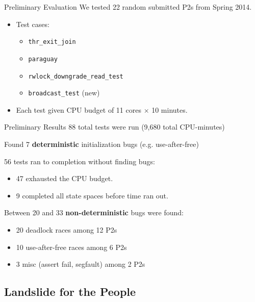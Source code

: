 \documentclass[xcolor=dvipsnames]{beamer}
\begin{document}
\begin{frame}{Preliminary Evaluation}
	We tested 22 random submitted P2s from Spring 2014.
	\begin{itemize}
		\item Test cases:
		\begin{itemize}
			\item {\tt thr\_exit\_join}
			\item {\tt paraguay}
			\item {\tt rwlock\_downgrade\_read\_test}
			\item {\tt broadcast\_test} (new)
		\end{itemize}
		\item Each test given CPU budget of 11 cores $\times$ 10 minutes.
	\end{itemize}
\end{frame}

\begin{frame}{Preliminary Results}
	88 total tests were run (9,680 total CPU-minutes)
	\linegap

	Found 7 {\bf deterministic} initialization bugs (e.g. use-after-free)
	\linegap

	56 tests ran to completion without finding bugs:
	\begin{itemize}
		\item 47 exhausted the CPU budget.
		\item 9 completed all state spaces before time ran out.
	\end{itemize}
	\linegap

	Between 20 and 33 {\bf non-deterministic} bugs were found:
	\begin{itemize}
		\item 20 deadlock races among 12 P2s
		\item 10 use-after-free races among 6 P2s
		\item 3 misc (assert fail, segfault) among 2 P2s
	\end{itemize}
\end{frame}


\subsection{Landslide for the People}
\end{document}
